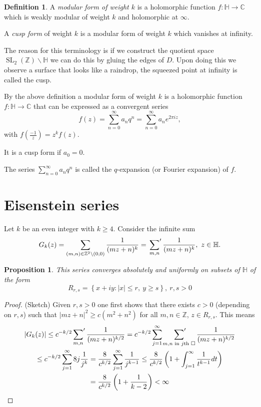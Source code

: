 \documentclass{article}
\newtheorem*{prop}{Proposition}
\theoremstyle{definition}
\newtheorem*{defn}{Definition}
\DeclareMathOperator{\SL}{SL}
\begin{document}
\begin{defn}
A \emph{modular form of weight $k$} is a holomorphic function $f\colon\mathbb{H}\to\mathbb{C}$ which is weakly modular of weight $k$ and holomorphic at $\infty$.

A \emph{cusp form} of weight $k$ is a modular form of weight $k$ which vanishes at infinity.
\end{defn}

The reason for this terminology is if we construct the quotient space $\SL_2(\mathbb{Z})\backslash \mathbb{H}$ we can do this by gluing the edges of $D$.
Upon doing this we observe a surface that looks like a raindrop, the squeezed point at infinity is called the cusp.

By the above definition a modular form of weight $k$ is a holomorphic function $f\colon\mathbb{H}\to\mathbb{C}$ that can be expressed as a convergent series
\[f(z)=\sum_{n=0}^{\infty}a_nq^n = \sum_{n=0}^{\infty} a_ne^{2\pi i z},\]
with $f\left(\frac{-1}{z}\right) = z^kf(z)$.

It is a cusp form if $a_0 = 0$.

The series $\sum_{n=0}^{\infty}a_nq^n$ is called the $q$-expansion (or Fourier expansion) of $f$.

\section{Eisenstein series}
Let $k$ be an even integer with $k \ge 4$.
Consider the infinite sum 
\[G_k(z) = \sum_{(m,n)\in\mathbb{Z}^2\setminus(0,0)} \frac{1}{(mz+n)^k} = \sideset{}{'}\sum_{m,n}\frac{1}{(mz+n)^k},\ z\in\mathbb{H}.\]

\begin{prop}
This series converges absolutely and uniformly on subsets of $\mathbb{H}$ of the form
\[R_{r,s} = \left\{ x+iy\colon |x|\leq r,\ y\geq s\right\},\ r,s>0\]
\end{prop}

\begin{proof}(Sketch) Given $r,s>0$ one first shows that there exists $c >0$ (depending on $r,s$) such that $|mz+n|^2 \ge c(m^2+n^2)$ for all $m,n\in\mathbb{Z}$, $z\in R_{r,s}$.
This means 
\begin{multline*}
|G_k(z)|\le c^{-k/2}\sideset{}{'}\sum_{m,n}\frac{1}{(mz+n)^{k/2}} = c^{-k/2}\sum_{j=1}^{\infty}\sideset{}{'}\sum_{m,n\text{ in $j$th } \square}\frac{1}{(mz+n)^{k/2}} \\
\le c^{-k/2}\sum_{j=1}^{\infty}8j\frac{1}{j^k} = \frac{8}{c^{k/2}}\sum_{j=1}^{\infty} \frac{1}{j^{k-1}} \le \frac{8}{c^{k/2}}\left(1 + \int_{j=1}^{\infty} \frac{1}{t^{k-1}} dt\right) \\
= \frac{8}{c^{k/2}}\left(1+ \frac{1}{k-2}\right)<\infty
\end{multline*}
\end{proof}
\end{document}
